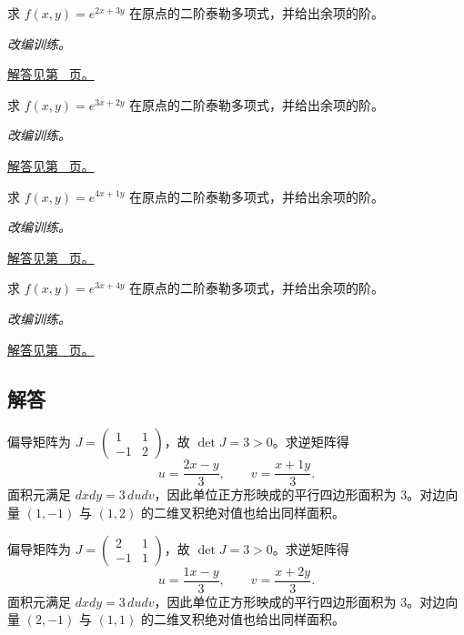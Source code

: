 \documentclass[UTF8,12pt,a4paper,fontset=fandol]{ctexart}
\begin{document}
\begin{example}[二元函数的二阶泰勒式]\label{ex:c33q21}
求 $f(x,y)=e^{2x+3y}$ 在原点的二阶泰勒多项式，并给出余项的阶。
\par\textit{改编训练。}\par\hyperref[ans:c33q21]{解答见第~\pageref{ans:c33q21} 页。}
\end{example}
\begin{example}[二元函数的二阶泰勒式]\label{ex:c33q22}
求 $f(x,y)=e^{3x+2y}$ 在原点的二阶泰勒多项式，并给出余项的阶。
\par\textit{改编训练。}\par\hyperref[ans:c33q22]{解答见第~\pageref{ans:c33q22} 页。}
\end{example}
\begin{example}[二元函数的二阶泰勒式]\label{ex:c33q23}
求 $f(x,y)=e^{4x+1y}$ 在原点的二阶泰勒多项式，并给出余项的阶。
\par\textit{改编训练。}\par\hyperref[ans:c33q23]{解答见第~\pageref{ans:c33q23} 页。}
\end{example}
\begin{example}[二元函数的二阶泰勒式]\label{ex:c33q24}
求 $f(x,y)=e^{3x+4y}$ 在原点的二阶泰勒多项式，并给出余项的阶。
\par\textit{改编训练。}\par\hyperref[ans:c33q24]{解答见第~\pageref{ans:c33q24} 页。}
\end{example}
\subsection{解答}
\begin{solve}\label{ans:c33q1}
偏导矩阵为 $J=\begin{pmatrix}1&1\\-1&2\end{pmatrix}$，故 $\det J=3>0$。求逆矩阵得
\[
u=\frac{2x-y}{3},\qquad v=\frac{x+1y}{3}.
\]
面积元满足 $dxdy=3\,dudv$，因此单位正方形映成的平行四边形面积为 $3$。对边向量 $(1,-1)$ 与 $(1,2)$ 的二维叉积绝对值也给出同样面积。
\end{solve}

\begin{solve}\label{ans:c33q2}
偏导矩阵为 $J=\begin{pmatrix}2&1\\-1&1\end{pmatrix}$，故 $\det J=3>0$。求逆矩阵得
\[
u=\frac{1x-y}{3},\qquad v=\frac{x+2y}{3}.
\]
面积元满足 $dxdy=3\,dudv$，因此单位正方形映成的平行四边形面积为 $3$。对边向量 $(2,-1)$ 与 $(1,1)$ 的二维叉积绝对值也给出同样面积。
\end{solve}
\end{document}

